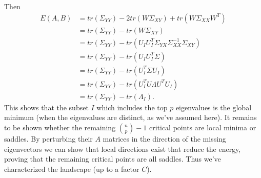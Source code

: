 \documentclass[11pt]{article}
\begin{document}
Then
\begin{align*}
  E(A,B) &= tr(\Sigma_{YY}) - 2 tr(W \Sigma_{XY}) + tr(W\Sigma_{XX}W^T)\\
  &= tr(\Sigma_{YY}) - tr(W\Sigma_{XY})\\
  &= tr(\Sigma_{YY}) - tr(U_I U_I^T \Sigma_{YX} \Sigma_{XX}^{-1} \Sigma_{XY})\\
  &= tr(\Sigma_{YY}) - tr(U_I U_I^T \Sigma)\\
  &= tr(\Sigma_{YY}) - tr(U_I^T \Sigma U_I )\\ 
  &= tr(\Sigma_{YY}) - tr(U_I^T U \Lambda U^T U_I )\\
  &= tr(\Sigma_{YY}) - tr(\Lambda_I). 
\end{align*}
This shows that the subset $I$ which includes the top $p$ eigenvalues is the global minimum (when the eigenvalues are distinct, as we've assumed here). It remains to be shown whether the remaining ${n \choose p} - 1$ critical points are local minima or saddles. By perturbing their $A$ matrices in the direction of the missing eigenvectors we can show that local directions exist that reduce the energy, proving that the remaining critical points are all saddles. Thus we've characterized the landscape (up to a factor $C$).
\end{document}
